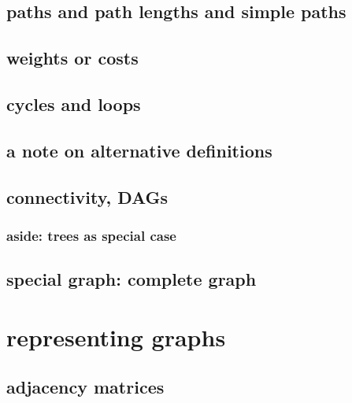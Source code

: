 

\subsection{paths and path lengths and simple paths}



\subsection{weights or costs}



\subsection{cycles and loops}



\subsection{a note on alternative definitions}



\subsection{connectivity, DAGs}



\subsubsection{aside: trees as special case}



\subsection{special graph: complete graph}



\section{representing graphs}

\subsection{adjacency matrices}

